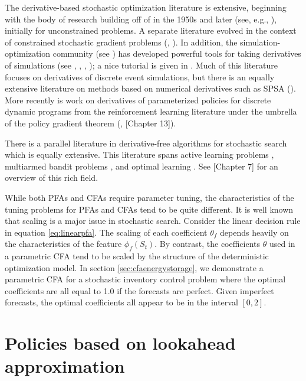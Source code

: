 \documentclass[11pt,oneside,fleqn,reqno,titlepage]{article}
\begin{document}
The derivative-based stochastic optimization literature is extensive, beginning with the body of research building off of \cite{RoMo51} in the 1950s and later (see, e.g., \cite{Dv56}), initially for unconstrained problems.  A separate literature evolved in the context of constrained stochastic gradient problems (\cite{Sh79}, \cite{Ermoliev1983}).  In addition, the simulation-optimization community (see \cite{fu2015handbook}) has developed powerful tools for taking derivatives of simulations (see \cite{glasserman1991gradient}, \cite{ho1992discrete}, \cite{kushner2003stochastic}, \cite{cao2008stochastic});  a nice tutorial is given in \cite{chau2014simulation}. Much of this literature focuses on derivatives of discrete event simulations, but there is an equally extensive literature on methods based on numerical derivatives such as SPSA (\cite{spall2005introduction,NesSpo17,GhaLan12}).  More recently is work on derivatives of parameterized policies for discrete dynamic programs from the reinforcement learning literature under the umbrella of the policy gradient theorem (\cite{SuMcSi2000}, \cite{Sutton2018}[Chapter 13]).

There is a parallel literature in derivative-free algorithms for stochastic search which is equally extensive.  This literature spans active learning problems \citep{Settles2010}, multiarmed bandit problems \citep{gittins2011}, and optimal learning \citep{PoRy2012}. See \cite{PowellRLSO}[Chapter 7] for an overview of this rich field.

While both PFAs and CFAs require parameter tuning, the characteristics of the tuning problems for PFAs and CFAs tend to be quite different.  It is well known that scaling is a major issue in stochastic search.  Consider the linear decision rule in equation \eqref{eq:linearpfa}.  The scaling of each coefficient $\theta_f$ depends heavily on the characteristics of the feature $\phi_f(S_t)$.  By contrast, the coefficients $\theta$ used in a parametric CFA tend to be scaled by the structure of the deterministic optimization model.  In section \ref{sec:cfaenergystorage}, we demonstrate a parametric CFA for a stochastic inventory control problem where the optimal coefficients are all equal to 1.0 if the forecasts are perfect.  Given imperfect forecasts, the optimal coefficients all appear to be in the interval $[0,2]$.



\section{Policies based on lookahead approximation}
\label{sec:lookaheadpolicies}
\end{document}
